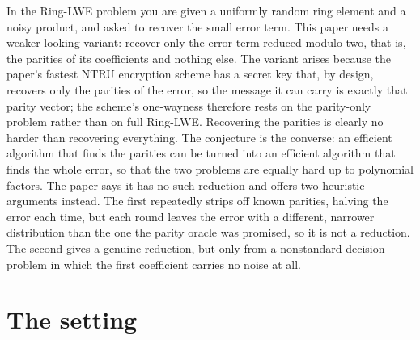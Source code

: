 \documentclass{aicr-conjecture}
\begin{document}

\vspace{0.4em}

\begin{informalconjecture}
In the Ring-LWE problem you are given a uniformly random ring element
and a noisy product, and asked to recover the small error term. This
paper needs a weaker-looking variant: recover only the error term
reduced modulo two, that is, the parities of its coefficients and
nothing else. The variant arises because the paper's fastest NTRU
encryption scheme has a secret key that, by design, recovers only the
parities of the error, so the message it can carry is exactly that
parity vector; the scheme's one-wayness therefore rests on the
parity-only problem rather than on full Ring-LWE. Recovering the
parities is clearly no harder than recovering everything. The
conjecture is the converse: an efficient algorithm that finds the
parities can be turned into an efficient algorithm that finds the whole
error, so that the two problems are equally hard up to polynomial
factors. The paper says it has no such reduction and offers two
heuristic arguments instead. The first repeatedly strips off known
parities, halving the error each time, but each round leaves the error
with a different, narrower distribution than the one the parity oracle
was promised, so it is not a reduction. The second gives a genuine
reduction, but only from a nonstandard decision problem in which the
first coefficient carries no noise at all.
\end{informalconjecture}

\section{The setting}\label{sec:setting}
\end{document}
